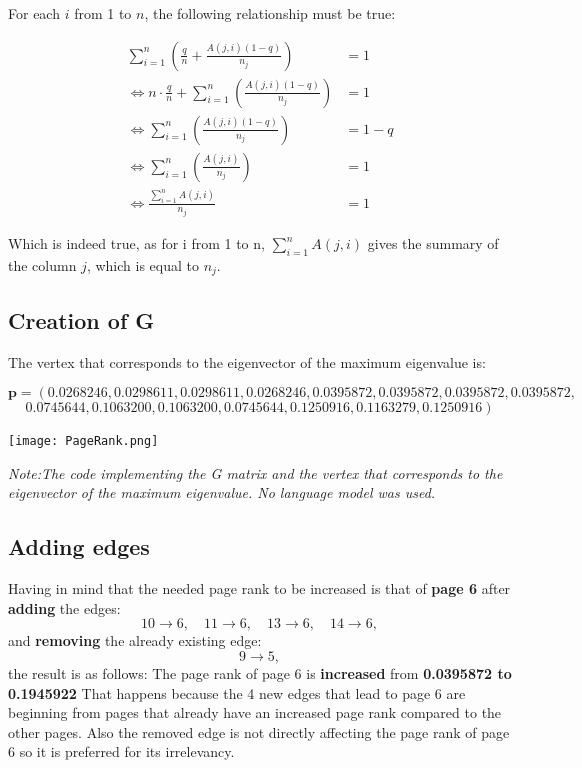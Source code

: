 \documentclass{article}
\begin{document}
For each $i$ from 1 to $n$, the following relationship must be true:


\begin{align*}
\sum_{i=1}^{n} \left( \frac{q}{n} + \frac{A(j,i)(1-q)}{n_j} \right) &= 1 \\
\iff n \cdot\frac{q}{n} + \sum_{i=1}^{n}\left(\frac{A(j,i)(1-q)}{n_j} \right) &= 1 \\
\iff \sum_{i=1}^{n} \left(\frac{A(j,i)(1-q)}{n_j} \right) &= 1 - q \\
\iff \sum_{i=1}^{n} \left(\frac{A(j,i)}{n_j} \right) &= 1 \\
\iff \frac{\sum_{i=1}^{n} A(j,i)}{n_j} &= 1
\end{align*}

Which is indeed true, as for i from 1 to n, $\sum_{i=1}^{n} A(j,i)$ gives the summary of the column $j$, which is equal to $n_j$.
\newpage
\subsection{Creation of G}


The vertex that corresponds to the eigenvector of the maximum eigenvalue is:

\[
\mathbf{p} = \left( 
0.0268246, 0.0298611, 0.0298611, 0.0268246, 0.0395872, 0.0395872, 0.0395872, 0.0395872, 
\right.
\]
\[
\left.
0.0745644, 0.1063200, 0.1063200, 0.0745644, 0.1250916, 0.1163279, 0.1250916 
\right)
\]

\begin{tcolorbox}[colback=gray!10, colframe=gray!80, width=\textwidth, sharp corners]
    \centering 
    \texttt{[image: PageRank.png]}     

    \vspace{0.2cm} 
    
    \small\textit{Note:The code implementing the G matrix and the vertex that corresponds to the eigenvector of the maximum eigenvalue. No language model was used.}
\end{tcolorbox}

\subsection{Adding edges}
Having in mind that the needed page rank to be increased is that of \textbf{page 6}
after \textbf{adding} the edges:
\[
10 \to 6, \quad 11 \to 6, \quad 13 \to 6, \quad 14 \to 6,
\]
and \textbf{removing} the already existing edge:
\[
9 \to 5,
\]
the result is as follows:
The page rank of page 6 is \textbf{increased} from \textbf{0.0395872 to 0.1945922}
That happens because the 4 new edges that lead to page 6 are beginning from pages that already have an increased page rank compared to the other pages. Also the removed edge is not directly affecting the page rank of page 6 so it is preferred for its irrelevancy. 
\end{document}
